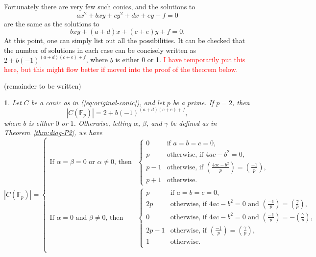 \documentclass[10pt,a4paper]{amsart}
\numberwithin{equation}{section}
\numberwithin{figure}{section}
\theoremstyle{definition}
\theoremstyle{remark}
\theoremstyle{plain}
\newtheorem{thm}{\protect\theoremname}[section]
\theoremstyle{plain}
\theoremstyle{definition}
\theoremstyle{plain}
\theoremstyle{plain}
\providecommand{\theoremname}{Theorem}
\newcommand{\legendre}[2]{\genfrac{(}{)}{}{}{#1}{#2}}
\newcommand{\F}{\mathbb{F}}
\begin{document}
    Fortunately there are very few such conics, and the solutions to 
    \[ ax^2 + bxy + cy^2 + dx + ey + f = 0 \] 
    are the same as the solutions to 
    \[ bxy + (a+d)x + (c+e)y + f = 0.  \] 
    At this point, one can simply list out all the
    possibilities. It can be checked that the number of solutions in each case can
    be concisely written as $2 + b(-1)^{(a+d)(c+e) + f}$, where $b$ is either 0 or
    1. \textcolor{red}{I have temporarily put this here, but this might flow better
    if moved into the proof of the theorem below. }

    (remainder to be written)

    \begin{thm}
Let $C$ be a conic as in (\ref{eq:original-conic}), and let $p$ be a prime. If $p=2$, then
\begin{equation*}
|C(\F_p)|=2 + b(-1)^{(a+d)(c+e) + f},
\end{equation*}
where $b$ is either $0$ or $1$. Otherwise, letting $\alpha$, $\beta$, and $\gamma$ be defined as in Theorem~\ref{thm:diag-P2}, we have
\begin{equation*}
|C(\F_p)|=\begin{cases}
\textrm{If }\alpha=\beta=0\textrm{ or }\alpha\ne 0\textrm{, then}&\begin{cases}
0&\textrm{if }a=b=c=0,\\
p&\textrm{otherwise, if }4ac-b^2=0,\\
p-1&\textrm{otherwise, if }\legendre{4ac-b^2}{p}=\legendre{-1}{p},\\
p+1&\textrm{otherwise.}
\end{cases}\\
\textrm{If }\alpha=0\textrm{ and }\beta\ne 0\textrm{, then}&\begin{cases}
p&\textrm{if }a=b=c=0,\\
2p&\textrm{otherwise, if }4ac-b^2=0\textrm{ and }\legendre{-1}{p}=\legendre{\gamma}{p},\\
0&\textrm{otherwise, if }4ac-b^2=0\textrm{ and }\legendre{-1}{p}=-\legendre{\gamma}{p},\\
2p-1&\textrm{otherwise, if }\legendre{-1}{p}=\legendre{\gamma}{p},\\
1&\textrm{otherwise.}\\
\end{cases}\\
\end{cases}
\end{equation*}

\end{thm}
\end{document}
